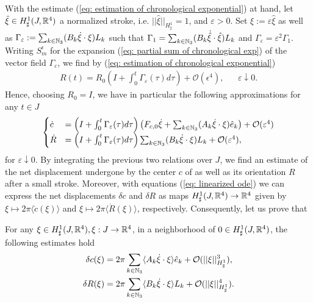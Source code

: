 With the estimate (\ref{eq: estimation of chronological exponential}) at hand, let $\hat{\xi} \in H^1_{\sharp}(J, \mathbb{R}^4)$ a normalized stroke, i.e. $||\hat{\xi}||_{H_{\sharp}^1} = 1$, and $\varepsilon > 0$. Set $\xi := \varepsilon \hat{\xi}$ as well as $\Gamma_\varepsilon := \sum_{k \in \mathbb{N}_3}(B_k \dot{\xi} \cdot \xi) L_k$ such that $\Gamma_1 = \sum_{k \in \mathbb{N}_3}(B_k \dot{\hat{\xi}} \cdot \hat{\xi}) L_k$ and  $\Gamma_\varepsilon = \varepsilon^2 \Gamma_1$. Writing $S_{m}^{\epsilon}$ for the expansion (\ref{eq: partial sum of chronological exp}) of the vector field $\Gamma_\varepsilon$, we find by (\ref{eq: estimation of chronological exponential})
\begin{align}
	R(t) = R_0 \left ( I + \int_{0}^{t} \Gamma_\varepsilon(\tau) d\tau \right ) + \mathcal{O}(\epsilon^4), & & \varepsilon \downarrow 0.
\end{align}
Hence, choosing $R_0 = I$, we have in particular the following approximations for any $t \in J $
\begin{align}
\label{eq: linearized ode}
\begin{cases}
\dot{c} &= \left ( I + \int_{0}^{t} \Gamma_\varepsilon(\tau) d\tau \right ) \left ( F_{c,0} \dot{\xi} + \sum_{k \in \mathbb{N}_3} (A_k \dot{\xi} \cdot \xi) \hat{e}_k \right )  + \mathcal{O}(\varepsilon^4)\\
\dot{R} &= \left ( I + \int_{0}^{t} \Gamma_\varepsilon(\tau) d\tau \right ) \sum_{k \in \mathbb{N}_3}(B_k \dot{\xi} \cdot \xi) L_k + \mathcal{O}(\varepsilon^4),
\end{cases}
\end{align}
for $\varepsilon\downarrow 0$. By integrating the previous two relations over $J$, we find an estimate of the net displacement undergone by the center $c$ of \spr as well as its orientation $R$ after a small stroke. Moreover, with equations (\ref{eq: linearized ode}) we can express the net displacements $\delta c$ and $\delta R$ as maps $H_{\sharp}^1(J,\mathbb{R}^4) \to \mathbb{R}^4$ given by $\xi \mapsto 2 \pi \langle \dot{c}(\xi) \rangle $ and $\xi \mapsto 2 \pi \langle \dot{R}(\xi) \rangle$, respectively. Consequently, let us prove that

\begin{proposition}
For any $\xi \in H_\sharp^1(J, \mathbb{R}^4), \xi: J \to \mathbb{R}^4$, in a neighborhood of $0 \in H_{\sharp}^{1}(J, \mathbb{R}^4)$, the following estimates hold
\begin{equation}
\begin{aligned}
\delta c(\xi) &= 2 \pi \sum_{k \in \mathbb{N}_3} \langle A_k \dot{\xi} \cdot \xi \rangle \hat{e}_k + \mathcal{O}(||\xi||_{H^1_{\sharp}}^3),\\
\delta R(\xi) &= 2 \pi \sum_{k \in \mathbb{N}_3} \langle B_k \dot{\xi} \cdot \xi \rangle L_k + \mathcal{O}(||\xi||^4_{H_\sharp^1}).
\end{aligned}
\end{equation}
\end{proposition}

